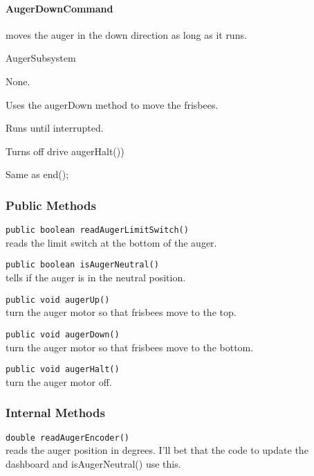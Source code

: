 \documentclass[]{article}
\begin{document}
\paragraph{AugerDownCommand} moves the auger in the down direction as long as it runs.
\begin{description}[topsep=0ex]
\item[requires] AugerSubsystem
\item[initialization]  None.
\item[execute] Uses the augerDown method to move the frisbees.
\item[isDone] Runs until interrupted.
\item[end] Turns off drive augerHalt())
\item[interrupted] Same as end();
\end{description}

\subsubsection{Public Methods}

\noindent
\lstinline[]|public boolean readAugerLimitSwitch()| \\
reads the limit switch at the bottom of the auger.

\noindent
\lstinline[]|public boolean isAugerNeutral()| \\
tells if the auger is in the neutral position.

\noindent
\lstinline[]|public void augerUp()| \\
turn the auger motor so that frisbees move to the top.

\noindent
\lstinline[]|public void augerDown()| \\
turn the auger motor so that frisbees move to the bottom.

\noindent
\lstinline[]|public void augerHalt()| \\
turn the auger motor off.

\subsubsection{Internal Methods}

\noindent
\lstinline[]|double readAugerEncoder()| \\
reads the auger position in degrees.
I'll bet that the code to update the dashboard and isAugerNeutral() use this.

\end{document}
